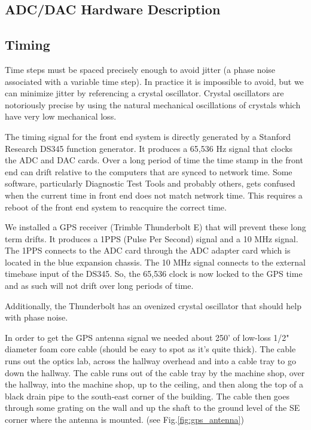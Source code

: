 \subsection{ADC/DAC Hardware Description}

\subsection{Timing}

Time steps must be spaced precisely enough to avoid jitter (a phase noise
associated with a variable time step). In practice it is impossible to
avoid, but we can minimize jitter by referencing a crystal oscillator.
Crystal oscillators are notoriously precise by using the natural mechanical 
oscillations of crystals which have very low mechanical loss.

The timing signal for the front end system is directly generated by a Stanford Research DS345 function generator. It produces a 65,536 Hz signal that clocks the ADC and DAC cards. Over a long period of time the time stamp in the front end can drift relative to the computers that are synced to network time. Some software, particularly Diagnostic Test Tools and probably others, gets confused when the current time in front end does not match network time. This requires a reboot of the front end system to reacquire the correct time.

We installed a GPS receiver (Trimble Thunderbolt E) that will prevent these
long term drifts.
It produces a 1PPS (Pulse Per Second) signal and a 10 MHz signal.
The 1PPS connects to the ADC card through the ADC adapter card which is
located in the blue expansion chassis.
The 10 MHz signal connects to the external timebase input of the DS345.
So, the 65,536 clock is now locked to the GPS time and as such will not drift
over long periods of time.

Additionally, the Thunderbolt has an ovenized crystal oscillator that should help with phase noise.

In order to get the GPS antenna signal we needed about 250' of low-loss 1/2" diameter foam core cable (should be easy to spot as it's quite thick). The cable runs out the optics lab, across the hallway overhead and into a cable tray to go down the hallway. The cable runs out of the cable tray by the machine shop, over the hallway, into the machine shop, up to the ceiling, and then along the top of a black drain pipe to the south-east corner of the building. The cable then goes through some grating on the wall and up the shaft to the ground level of the SE corner where the antenna is mounted. (see Fig.\ref{fig:gps_antenna})

